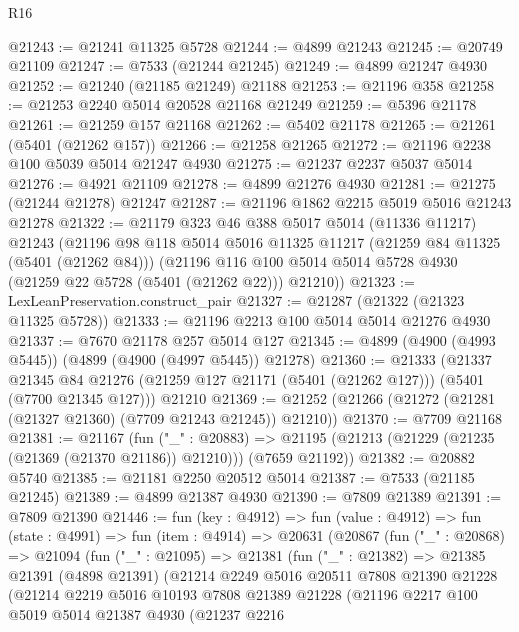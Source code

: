 \begin{lexlean}{R16}
\begin{coremodule}
@21243 := @21241 @11325 @5728
@21244 := @4899 @21243
@21245 := @20749 @21109
@21247 := @7533 (@21244 @21245)
@21249 := @4899 @21247 @4930
@21252 := @21240 (@21185 @21249) @21188
@21253 := @21196 @358
@21258 := @21253 @2240 @5014 @20528 @21168 @21249
@21259 := @5396 @21178
@21261 := @21259 @157 @21168
@21262 := @5402 @21178
@21265 := @21261 (@5401 (@21262 @157))
@21266 := @21258 @21265
@21272 := @21196 @2238 @100 @5039 @5014 @21247 @4930
@21275 := @21237 @2237 @5037 @5014
@21276 := @4921 @21109
@21278 := @4899 @21276 @4930
@21281 := @21275 (@21244 @21278) @21247
@21287 := @21196 @1862 @2215 @5019 @5016 @21243 @21278
@21322 := @21179
    @323
    @46
    @388
    @5017
    @5014
    (@11336 @11217)
    @21243
    (@21196
      @98
      @118
      @5014
      @5016
      @11325
      @11217
      (@21259 @84 @11325 (@5401 (@21262 @84)))
      (@21196 @116 @100 @5014 @5014 @5728 @4930 (@21259 @22 @5728 (@5401 (@21262 @22))) @21210))
@21323 := LexLeanPreservation.construct_pair
@21327 := @21287 (@21322 (@21323 @11325 @5728))
@21333 := @21196 @2213 @100 @5014 @5014 @21276 @4930
@21337 := @7670 @21178 @257 @5014 @127
@21345 := @4899 (@4900 (@4993 @5445)) (@4899 (@4900 (@4997 @5445)) @21278)
@21360 := @21333
    (@21337
      @21345
      @84
      @21276
      (@21259 @127 @21171 (@5401 (@21262 @127)))
      (@5401 (@7700 @21345 @127)))
    @21210
@21369 := @21252 (@21266 (@21272 (@21281 (@21327 @21360) (@7709 @21243 @21245)) @21210))
@21370 := @7709 @21168
@21381 := @21167
    (fun ("_" : @20883) =>
    @21195 (@21213 (@21229 (@21235 (@21369 (@21370 @21186)) @21210))) (@7659 @21192))
@21382 := @20882 @5740
@21385 := @21181 @2250 @20512 @5014
@21387 := @7533 (@21185 @21245)
@21389 := @4899 @21387 @4930
@21390 := @7809 @21389
@21391 := @7809 @21390
@21446 := fun (key : @4912) =>
  fun (value : @4912) =>
  fun (state : @4991) =>
  fun (item : @4914) =>
  @20631
    (@20867
      (fun ("_" : @20868) =>
      @21094
        (fun ("_" : @21095) =>
        @21381
          (fun ("_" : @21382) =>
          @21385
            @21391
            (@4898 @21391)
            (@21214
              @2249
              @5016
              @20511
              @7808
              @21390
              @21228
              (@21214
                @2219
                @5016
                @10193
                @7808
                @21389
                @21228
                (@21196
                  @2217
                  @100
                  @5019
                  @5014
                  @21387
                  @4930
                  (@21237
                    @2216

\end{coremodule}
\end{lexlean}
